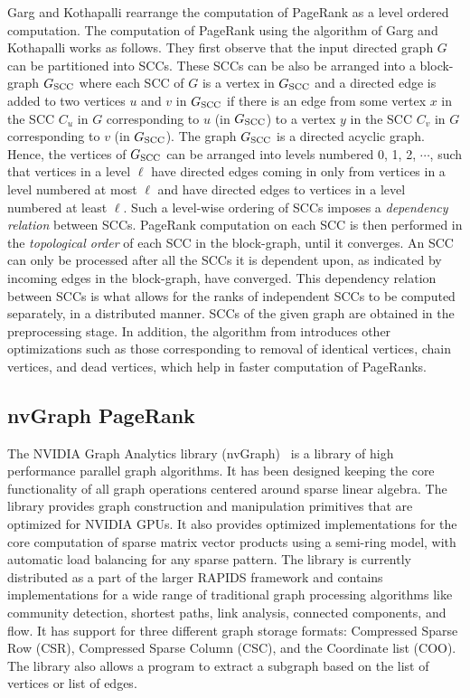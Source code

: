 Garg and Kothapalli \cite{pr-sticd16} rearrange the computation of PageRank as a level ordered computation. The computation of PageRank using the algorithm of Garg and Kothapalli \cite{pr-sticd16} works as follows. They first observe that the input directed graph $G$ can be partitioned into SCCs. These SCCs can be also be arranged into a block-graph $G_{\mathrm{SCC}}$ where each SCC of $G$ is a vertex in $G_{\mathrm{SCC}}$ and a directed edge is added to two vertices $u$ and $v$ in $G_{\mathrm{SCC}}$ if there is an edge from some vertex $x$ in the SCC $C_u$ in $G$ corresponding to $u$ (in $G_{\mathrm{SCC}}$) to a vertex $y$ in the SCC $C_v$ in $G$ corresponding to $v$ (in $G_{\mathrm{SCC}}$). The graph $G_{\mathrm{SCC}}$ is a directed acyclic graph. Hence, the vertices of $G_{\mathrm{SCC}}$ can be arranged into levels numbered 0, 1, 2, $\cdots$, such that vertices in a level $\ell$ have directed edges coming in only from vertices in a level numbered at most $\ell$ and have directed edges to vertices in a level numbered at least $\ell$. Such a level-wise ordering of SCCs imposes a \emph{dependency relation} between SCCs. PageRank computation on each SCC is then performed in the \emph{topological order} of each SCC in the block-graph, until it converges. An SCC can only be processed after all the SCCs it is dependent upon, as indicated by incoming edges in the block-graph, have converged. This dependency relation between SCCs is what allows for the ranks of independent SCCs to be computed separately, in a distributed manner. SCCs of the given graph are obtained in the preprocessing stage. In addition, the algorithm from \cite{pr-sticd16} introduces other optimizations such as those corresponding to removal of identical vertices, chain vertices, and dead vertices, which help in faster computation of PageRanks.







\subsection{nvGraph PageRank}

The NVIDIA Graph Analytics library (nvGraph)~\cite{pr-nvgraph} is a library of high performance parallel graph algorithms. It has been designed keeping the core functionality of all graph operations centered around sparse linear algebra. The library provides graph construction and manipulation primitives that are optimized for NVIDIA GPUs. It also provides optimized implementations for the core computation of sparse matrix vector products using a semi-ring model, with automatic load balancing for any sparse pattern. The library is currently distributed as a part of the larger RAPIDS framework and contains implementations for a wide range of traditional graph processing algorithms like community detection, shortest paths, link analysis, connected components, and flow. It has support for three different graph storage formats: Compressed Sparse Row (CSR), Compressed Sparse Column (CSC), and the Coordinate list (COO). The library also allows a program to extract a subgraph based on the list of vertices or list of edges. 





